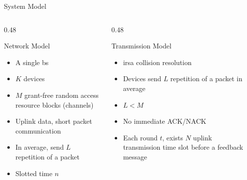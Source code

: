 \documentclass[9pt]{beamer}
\begin{document}


\begin{frame}{System Model}
    \begin{columns}
        \begin{column}{0.48\textwidth}
            \begin{block}{Network Model}
                \begin{itemize}
                    \item A single \gls{bs}
                    \item $K$ devices
                    \item $M$ grant-free random access resource blocks (channels)
                    \item Uplink data, short packet communication
                    \item In average, send $L$ repetition of a packet
                    \item Slotted time $n$
                \end{itemize}
            \end{block}
        \end{column}
        \begin{column}{0.48\textwidth}
            \begin{block}{Transmission Model}
                \begin{itemize}
                    \item \gls{irsa} collision resolution
                    \item Devices send $L$ repetition of a packet in average
                    \item $L < M$
                    \item No immediate ACK/NACK
                    \item Each round $t$, exists $N$ uplink transmission time slot before a feedback message
                \end{itemize}
            \end{block}
        \end{column}
    \end{columns}
\end{frame}
\end{document}
